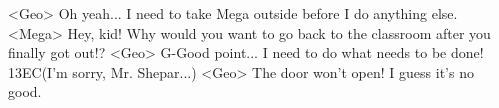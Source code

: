 <Geo> Oh yeah... I need to take Mega outside before I do anything else. 
<Mega> Hey, kid! 
Why would you want to go back to the classroom after you finally got out!? 
<Geo> G-Good point... I need to do what needs to be done! 
{13}{EC}(I'm sorry, Mr. Shepar...) 
<Geo> The door won't open! I guess it's no good. 

